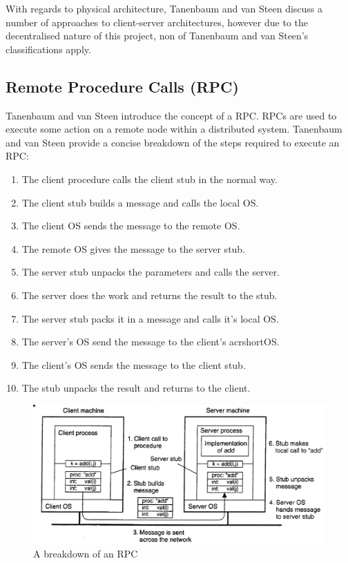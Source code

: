 \documentclass[a4paper, 11pt]{report}
\begin{document}
With regards to physical architecture, Tanenbaum and van Steen discuss a number of approaches to client-server architectures, however due to the decentralised nature of this project, non of Tanenbaum and van Steen's classifications apply. 

\subsection{Remote Procedure Calls (RPC)}
Tanenbaum and van Steen introduce the concept of a \acrfull{RPC}. \acrshort{RPC}s are used to execute some action on a remote node within a distributed system.  Tanenbaum and van Steen provide a concise breakdown of the steps required to execute an \acrshort{RPC}:

\begin{enumerate}
    \item The client procedure calls the client \gls{stub} in the normal way.
    \item The client \gls{stub} builds a message and calls the local \acrfull{OS}.
    \item The client \acrshort{OS} sends the message to the remote \acrshort{OS}.
    \item The remote \acrshort{OS} gives the message to the server \gls{stub}.
    \item The server \gls{stub} unpacks the parameters and calls the server.
    \item The server does the work and returns the result to the \gls{stub}.
    \item The server \gls{stub} packs it in a message and calls it's local \acrshort{OS}.
    \item The server's \acrshort{OS} send the message to the client's acrshort{OS}.
    \item The client's \acrshort{OS} sends the message to the client \gls{stub}.
    \item The \gls{stub} unpacks the result and returns to the client.
\end{enumerate}

\begin{figure}[H]
\centering
\includegraphics[width=\textwidth,keepaspectratio]{rpc}
\caption{A breakdown of an \acrshort{RPC} \cite{tanenbaumdist}} 
\label{fig:rpc}
\end{figure}
\end{document}

